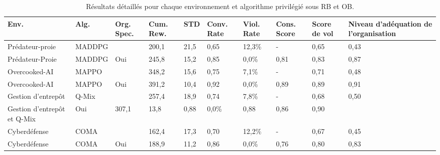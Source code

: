 \begin{table*}[h!]
    \centering
    \caption{Résultats détaillés pour chaque environnement et algorithme privilégié sous RB et OB.}
    \label{tab:detailed_results}
    \small
    \renewcommand{\arraystretch}{1.2}
    \begin{tabular}{p{3.5cm}p{1.5cm}p{}p{1.3cm}p{1cm}p{1.3cm}p{1.3cm}p{1.2cm}p{1.2cm}p{1cm}}
        \hline
        \textbf{Env.}               & \textbf{Alg.} & \textbf{Org. Spec.} & \textbf{Cum. Rew.} & \textbf{STD} & \textbf{Conv. Rate} & \textbf{Viol. Rate} & \textbf{Cons. Score} & \textbf{Score de vol} & \textbf{Niveau d'adéquation de l'organisation} \\ \hline
        Prédateur-proie             & MADDPG        &                     & 200,1              & 21,5         & 0,65                & 12,3\%              & -                    & 0,65                  & 0,43                                           \\
        Prédateur-Proie             & MADDPG        & Oui                 & 245,8              & 15,2         & 0,85                & 0,0\%               & 0,81                 & 0,83                  & 0,87                                           \\
        Overcooked-AI               & MAPPO         &                     & 348,2              & 15,6         & 0,75                & 7,1\%               & -                    & 0,71                  & 0,48                                           \\
        Overcooked-AI               & MAPPO         & Oui                 & 391,2              & 10,4         & 0,92                & 0,0\%               & 0,89                 & 0,89                  & 0,91                                           \\
        Gestion d'entrepôt          & Q-Mix         &                     & 257,4              & 18,9         & 0,74                & 7,8\%               & -                    & 0,68                  & 0,50                                           \\
        Gestion d'entrepôt et Q-Mix & Oui           & 307,1               & 13,8               & 0,88         & 0,0\%               & 0,88                & 0,86                 & 0,90                                                                   \\
        Cyberdéfense                & COMA          &                     & 162,4              & 17,3         & 0,70                & 12,2\%              & -                    & 0,67                  & 0,45                                           \\
        Cyberdéfense                & COMA          & Oui                 & 188,9              & 11,2         & 0,86                & 0,0\%               & 0,76                 & 0,80                  & 0,83                                           \\ \hline
    \end{tabular}
\end{table*}

